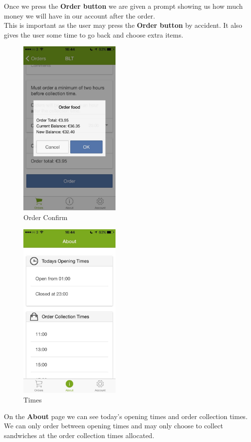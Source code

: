 \begin{minipage}{0.55\textwidth}
Once we press the \textbf{Order button} we are given a prompt showing us how much money we will have in our account after the order.
\\

This is important as the user may press the \textbf{Order button} by accident.
It also gives the user some time to go back and choose extra items.

\end{minipage}
\begin{minipage}{5cm}
	\begin{figure}[H]
		\includegraphics[width=5cm]{img/mobile-app/screen-shots/IMG_2910.jpg}
		\caption{Order Confirm}
	\end{figure}
\end{minipage} \hfill

\begin{minipage}{5cm}
	\begin{figure}[H]
		\includegraphics[width=5cm]{img/mobile-app/screen-shots/IMG_2911.jpg}
		\caption{Times}
	\end{figure}
\end{minipage} \hfill
\begin{minipage}{0.55\textwidth}
On the \textbf{About} page we can see today's opening times and order collection times.
\\

We can only order between opening times and may only choose to collect sandwiches at the order collection times allocated.
\end{minipage}

